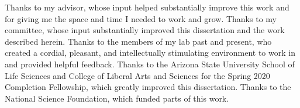 Thanks to my advisor, whose input helped substantially improve this work and for giving me the space and time I needed to work and grow.
Thanks to my committee, whose input substantially improved this dissertation and the work described herein.
Thanks to the members of my lab past and present, who created a cordial, pleasant, and intellectually stimulating environment to work in and provided helpful feedback.
Thanks to the Arizona State University School of Life Sciences and College of Liberal Arts and Sciences for the Spring 2020 Completion Fellowship, which greatly improved this dissertation.
Thanks to the National Science Foundation, which funded parts of this work.
